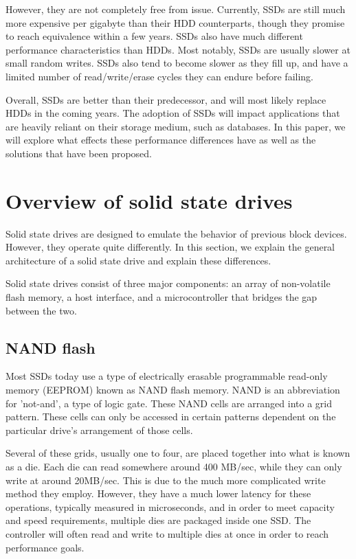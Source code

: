 \documentclass[format=acmsmall, review=false, screen=true]{acmart}
\begin{document}
However, they are not completely free from issue. Currently, SSDs are still much more expensive per gigabyte than their 
HDD counterparts, though they promise to reach equivalence within a few years. SSDs also have much different performance 
characteristics than HDDs. Most notably, SSDs are usually slower at small random writes. SSDs also tend to become slower 
as they fill up, and have a limited number of read/write/erase cycles they can endure before failing. 
\cite{Dumitru2007, Dirik2009, Xie2011}

Overall, SSDs are better than their predecessor, and will most likely replace HDDs in the coming years. The adoption of 
SSDs will impact applications that are heavily reliant on their storage medium, such as databases. In this paper, we will 
explore what effects these performance differences have as well as the solutions that have been proposed.

\section{Overview of solid state drives}

Solid state drives are designed to emulate the behavior of previous block devices. However, they operate quite differently. 
\cite{Lee2008, Dirik2009, Cornwell2012, Micheloni2013, MatejFucek2014, Chen2016} In this section, we explain the general 
architecture of a solid state drive and explain these differences.

Solid state drives consist of three major components: an array of non-volatile flash memory, a host interface, and a 
microcontroller that bridges the gap between the two. 

\subsection{NAND flash}

Most SSDs today use a type of electrically erasable programmable read-only memory (EEPROM) known as NAND flash memory. 
NAND is an abbreviation for 'not-and', a type of logic gate. These NAND cells are arranged into a grid pattern. These 
cells can only be accessed in certain patterns dependent on the particular drive's arrangement of those cells. 
\cite{Dirik2009, Cornwell2012, Micheloni2013, Chen2016}

Several of these grids, usually one to four, are placed together into what is known as a die. Each die can read somewhere 
around 400 MB/sec, while they can only write at around 20MB/sec. This is due to the much more complicated write method 
they employ. However, they have a much lower latency for these operations, typically measured in microseconds, and in 
order to meet capacity and speed requirements, multiple dies are packaged inside one SSD. The controller will often 
read and write to multiple dies at once in order to reach performance goals. 
\cite{Dirik2009, Cornwell2012, Micheloni2013, Chen2016}
\end{document}
